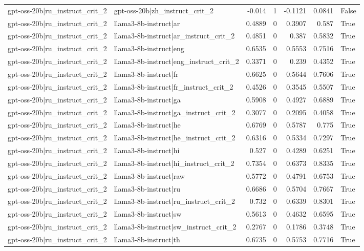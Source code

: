 \begin{table}
\begin{tabular}{l l r r r r l}
gpt-oss-20b|ru_instruct_crit_2 & gpt-oss-20b|zh_instruct_crit_2 & -0.014 & 1 & -0.1121 & 0.0841 & False \\
gpt-oss-20b|ru_instruct_crit_2 & llama3-8b-instruct|ar & 0.4889 & 0 & 0.3907 & 0.587 & True \\
gpt-oss-20b|ru_instruct_crit_2 & llama3-8b-instruct|ar_instruct_crit_2 & 0.4851 & 0 & 0.387 & 0.5832 & True \\
gpt-oss-20b|ru_instruct_crit_2 & llama3-8b-instruct|eng & 0.6535 & 0 & 0.5553 & 0.7516 & True \\
gpt-oss-20b|ru_instruct_crit_2 & llama3-8b-instruct|eng_instruct_crit_2 & 0.3371 & 0 & 0.239 & 0.4352 & True \\
gpt-oss-20b|ru_instruct_crit_2 & llama3-8b-instruct|fr & 0.6625 & 0 & 0.5644 & 0.7606 & True \\
gpt-oss-20b|ru_instruct_crit_2 & llama3-8b-instruct|fr_instruct_crit_2 & 0.4526 & 0 & 0.3545 & 0.5507 & True \\
gpt-oss-20b|ru_instruct_crit_2 & llama3-8b-instruct|ga & 0.5908 & 0 & 0.4927 & 0.6889 & True \\
gpt-oss-20b|ru_instruct_crit_2 & llama3-8b-instruct|ga_instruct_crit_2 & 0.3077 & 0 & 0.2095 & 0.4058 & True \\
gpt-oss-20b|ru_instruct_crit_2 & llama3-8b-instruct|he & 0.6769 & 0 & 0.5787 & 0.775 & True \\
gpt-oss-20b|ru_instruct_crit_2 & llama3-8b-instruct|he_instruct_crit_2 & 0.6316 & 0 & 0.5334 & 0.7297 & True \\
gpt-oss-20b|ru_instruct_crit_2 & llama3-8b-instruct|hi & 0.527 & 0 & 0.4289 & 0.6251 & True \\
gpt-oss-20b|ru_instruct_crit_2 & llama3-8b-instruct|hi_instruct_crit_2 & 0.7354 & 0 & 0.6373 & 0.8335 & True \\
gpt-oss-20b|ru_instruct_crit_2 & llama3-8b-instruct|raw & 0.5772 & 0 & 0.4791 & 0.6753 & True \\
gpt-oss-20b|ru_instruct_crit_2 & llama3-8b-instruct|ru & 0.6686 & 0 & 0.5704 & 0.7667 & True \\
gpt-oss-20b|ru_instruct_crit_2 & llama3-8b-instruct|ru_instruct_crit_2 & 0.732 & 0 & 0.6339 & 0.8301 & True \\
gpt-oss-20b|ru_instruct_crit_2 & llama3-8b-instruct|sw & 0.5613 & 0 & 0.4632 & 0.6595 & True \\
gpt-oss-20b|ru_instruct_crit_2 & llama3-8b-instruct|sw_instruct_crit_2 & 0.2767 & 0 & 0.1786 & 0.3748 & True \\
gpt-oss-20b|ru_instruct_crit_2 & llama3-8b-instruct|th & 0.6735 & 0 & 0.5753 & 0.7716 & True \\

\end{tabular}
\end{table}
